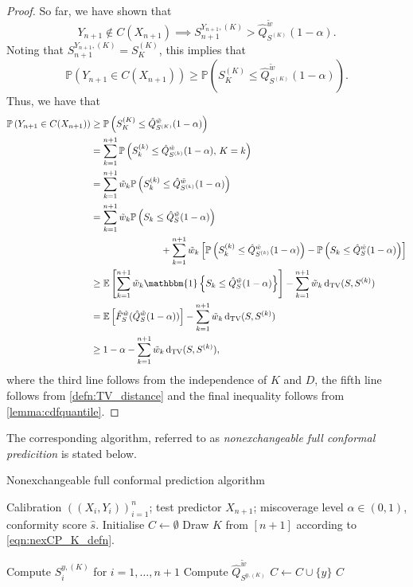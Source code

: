 \documentclass[11pt, titlepage]{article} %
\newcommand{\R}{\mathrm}
\newcommand{\Prob}[1]{\mathbb{P}\left( #1 \right)}
\newcommand{\Exp}[3]{\mathbb{E}\left#2 #1 \right#3}
\newcommand{\Ind}[1]{\mathbbm{1}\left\{ #1 \right\}}
\numberwithin{equation}{section}
\theoremstyle{definition}
\numberwithin{theorem}{section}
\numberwithin{lemma}{section}
\numberwithin{corollary}{section}
\numberwithin{proposition}{section}
\numberwithin{definition}{section}
\numberwithin{remark}{section}
\begin{document}
\begin{proof}
    \noindent
    So far, we have shown that \[Y_{n+1} \not \in C(X_{n+1}) \implies S_{n+1}^{Y_{n+1}, (K)} >\hat{Q}^{\tilde{w}}_{S^{(K)}}(1-\alpha).\] Noting that \(S_{n+1}^{Y_{n+1}, (K)} = S_K^{(K)}\), this implies that \[\Prob{Y_{n+1} \in C(X_{n+1}) } \geq \Prob{ S_K^{(K)} \leq \hat{Q}^{\tilde{w}}_{S^{(K)}}(1-\alpha) }. \]
    \noindent
    Thus, we have that
    \begin{align*}
        \Prob{Y_{n+1} \in C(X_{n+1})} &\geq \Prob{ S_K^{(K)} \leq \hat{Q}^{\tilde{w}}_{S^{(K)}}(1-\alpha) } \\
        &= \sum_{k=1}^{n+1} \Prob{S_k^{(k)} \leq \hat{Q}^{\tilde{w}}_{S^{(k)}}(1-\alpha), \, K=k} \\
        &= \sum_{k=1}^{n+1} \tilde{w}_k \Prob{S_k^{(k)} \leq \hat{Q}^{\tilde{w}}_{S^{(k)}}(1-\alpha)} \\
        &= \sum_{k=1}^{n+1} \tilde{w}_k \Prob{S_k \leq \hat{Q}^{\tilde{w}}_{S}(1-\alpha)} \\
        & \hspace{2.6cm} + \sum_{k=1}^{n+1} \tilde{w}_k \left[ \Prob{S_k^{(k)} \leq \hat{Q}^{\tilde{w}}_{S^{(k)}}(1-\alpha)} - \Prob{S_k \leq \hat{Q}^{\tilde{w}}_{S}(1-\alpha)} \right] \\
        &\geq \Exp{\sum_{k=1}^{n+1} \tilde{w}_k \Ind{S_k \leq \hat{Q}^{\tilde{w}}_{S}(1-\alpha)}}{[}{]} - \sum_{k=1}^{n+1} \tilde{w}_k \, \R{d_{TV}}(S, S^{(k)}) \\
        &= \Exp{\hat{F}^{\tilde{w}}_S(\hat{Q}^{\tilde{w}}_S (1-\alpha))}{[}{]} - \sum_{k=1}^{n+1} \tilde{w}_k \, \R{d_{TV}}(S, S^{(k)}) \\
        &\geq 1-\alpha - \sum_{k=1}^{n+1} \tilde{w}_k \, \R{d_{TV}}(S, S^{(k)}),
    \end{align*}
    where the third line follows from the independence of \(K\) and \(D\), the fifth line follows from \cref{defn:TV_distance} and the final inequality follows from \cref{lemma:cdfquantile}.
\end{proof}

\noindent
The corresponding algorithm, referred to as \textit{nonexchangeable full conformal predicition} is stated below.

\begin{algorithm}[H]
    \label{alg:nexCP}
    \caption{Nonexchangeable full conformal prediction algorithm}
    \begin{algorithmic}
        \Require Calibration \(((X_i, Y_i))_{i=1}^n\); test predictor \(X_{n+1}\); miscoverage level \(\alpha \in (0,1)\), conformity score \(\hat{s}\). 
        \State Initialise \(C \gets \emptyset\)
        \State Draw \(K\) from \([n+1]\) according to \eqref{eqn:nexCP_K_defn}.

            \State Compute \(S_i^{y, (K)}\) for \(i = 1, \ldots, n+1\)
            \State Compute \(\hat{Q}^{\tilde{w}}_{S^{y, (K)}}\)
                \State \(C \gets C \cup \{y\}\)
            \EndIf
        \EndFor
        \Ensure \(C\)
    \end{algorithmic}
\end{algorithm}
\end{document}
